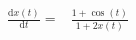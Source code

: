 \begin{align}
\frac{\mathrm{d} x\left( t \right)}{\mathrm{d}t} =& \frac{1 + \cos\left( t \right)}{1 + 2 x\left( t \right)}
\end{align}
